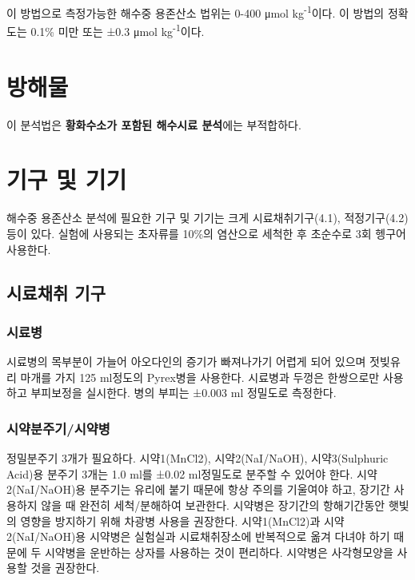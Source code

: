 \documentclass[
]{book}
\begin{document}
이 방법으로 측정가능한 해수중 용존산소 법위는 0-400 μmol kg\textsuperscript{-1}이다. 이 방법의 정확도는 0.1\% 미만 또는 ±0.3 μmol kg\textsuperscript{-1}이다.

\hypertarget{uxbc29uxd574uxbb3c}{%
\chapter{방해물}\label{uxbc29uxd574uxbb3c}}

이 분석법은 \textbf{황화수소가 포함된 해수시료 분석}에는 부적합하다.

\hypertarget{uxae30uxad6c-uxbc0f-uxae30uxae30}{%
\chapter{기구 및 기기}\label{uxae30uxad6c-uxbc0f-uxae30uxae30}}

해수중 용존산소 분석에 필요한 기구 및 기기는 크게 시료채취기구(4.1), 적정기구(4.2)등이 있다. 실험에 사용되는 초자류를 10\%의 염산으로 세척한 후 초순수로 3회 헹구어 사용한다.

\hypertarget{uxc2dcuxb8ccuxcc44uxcde8-uxae30uxad6c}{%
\section{시료채취 기구}\label{uxc2dcuxb8ccuxcc44uxcde8-uxae30uxad6c}}

\hypertarget{uxc2dcuxb8ccuxbcd1}{%
\subsection{시료병}\label{uxc2dcuxb8ccuxbcd1}}

시료병의 목부분이 가늘어 아오다인의 증기가 빠져나가기 어렵게 되어 있으며 젓빚유리 마개를 가지 125 ml정도의 Pyrex병을 사용한다. 시료병과 두껑은 한쌍으로만 사용하고 부피보정을 실시한다. 병의 부피는 ±0.003 ml 정밀도로 측정한다.

\hypertarget{uxc2dcuxc57duxbd84uxc8fcuxae30uxc2dcuxc57duxbcd1}{%
\subsection{시약분주기/시약병}\label{uxc2dcuxc57duxbd84uxc8fcuxae30uxc2dcuxc57duxbcd1}}

정밀분주기 3개가 필요하다. 시약1(MnCl2), 시약2(NaI/NaOH), 시약3(Sulphuric Acid)용 분주기 3개는 1.0 ml를 ±0.02 ml정밀도로 분주할 수 있어야 한다. 시약2(NaI/NaOH)용 분주기는 유리에 붙기 때문에 항상 주의를 기울여야 하고, 장기간 사용하지 않을 때 완전히 세척/분해하여 보관한다. 시약병은 장기간의 항해기간동안 햇빛의 영향을 방지하기 위해 차광병 사용을 권장한다. 시약1(MnCl2)과 시약2(NaI/NaOH)용 시약병은 실험실과 시료채취장소에 반복적으로 옮겨 다녀야 하기 때문에 두 시약병을 운반하는 상자를 사용하는 것이 편리하다. 시약병은 사각형모양을 사용할 것을 권장한다.
\end{document}
